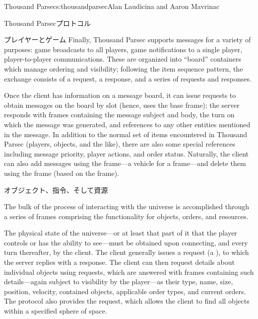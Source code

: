 \begin{aosachapter}{Thousand Parsec}{s:thousandparsec}{Alan Laudicina and Aaron Mavrinac}
\begin{aosasect1}{Thousand Parsecプロトコル}
\begin{aosasect2}{プレイヤーとゲーム}
Finally, Thousand Parsec supports messages for a variety of purposes:
game broadcasts to all players, game notifications to a single player,
player-to-player communications. These are organized into ``board''
containers which manage ordering and visibility; following the item
sequence pattern, the exchange consists of a 
request, a  response, and a series of
 requests and  responses.

Once the client has information on a message board, it can issue
 requests to obtain messages on the board by slot
(hence,  uses the  base
frame); the server responds with  frames containing the
message subject and body, the turn on which the message was generated,
and references to any other entities mentioned in the message. In
addition to the normal set of items encountered in Thousand Parsec
(players, objects, and the like), there are also some special
references including message priority, player actions, and order
status. Naturally, the client can also add messages using the
 frame---a vehicle for a 
frame---and delete them using the  frame (based
on the  frame).

\end{aosasect2}

\begin{aosasect2}{オブジェクト、指令、そして資源}

The bulk of the process of interacting with the universe is
accomplished through a series of frames comprising the functionality
for objects, orders, and resources.

The physical state of the universe---or at least that part of it that
the player controls or has the ability to see---must be obtained upon
connecting, and every turn thereafter, by the client. The client
generally issues a  request (a ), to which the server replies with a  response. The client can then request details about individual
objects using  requests, which are answered
with  frames containing such details---again subject to
visibility by the player---as their type, name, size, position,
velocity, contained objects, applicable order types, and current
orders. The protocol also provides the  request, which allows the client to find all objects
within a specified sphere of space.


\end{aosasect2}
\end{aosasect1}
\end{aosachapter}
